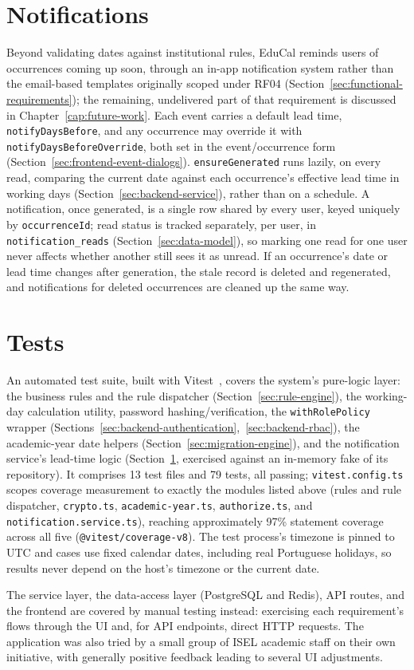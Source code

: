 \section{Notifications} \label{sec:backend-notifications}

Beyond validating dates against institutional rules, EduCal reminds users of occurrences coming up soon, through an in-app notification system rather than the email-based templates originally scoped under RF04 (Section~\ref{sec:functional-requirements}); the remaining, undelivered part of that requirement is discussed in Chapter~\ref{cap:future-work}. Each event carries a default lead time, \texttt{notifyDaysBefore}, and any occurrence may override it with \texttt{notifyDaysBeforeOverride}, both set in the event/occurrence form (Section~\ref{sec:frontend-event-dialogs}). \texttt{ensureGenerated} runs lazily, on every read, comparing the current date against each occurrence's effective lead time in working days (Section~\ref{sec:backend-service}), rather than on a schedule. A notification, once generated, is a single row shared by every user, keyed uniquely by \texttt{occurrenceId}; read status is tracked separately, per user, in \texttt{notification\_reads} (Section~\ref{sec:data-model}), so marking one read for one user never affects whether another still sees it as unread. If an occurrence's date or lead time changes after generation, the stale record is deleted and regenerated, and notifications for deleted occurrences are cleaned up the same way.

\section{Tests} \label{sec:backend-tests}

An automated test suite, built with Vitest~\cite{vitest}, covers the system's pure-logic layer: the business rules and the rule dispatcher (Section~\ref{sec:rule-engine}), the working-day calculation utility, password hashing/verification, the \texttt{withRolePolicy} wrapper (Sections~\ref{sec:backend-authentication},~\ref{sec:backend-rbac}), the academic-year date helpers (Section~\ref{sec:migration-engine}), and the notification service's lead-time logic (Section~\ref{sec:backend-notifications}, exercised against an in-memory fake of its repository). It comprises 13 test files and 79 tests, all passing; \texttt{vitest.config.ts} scopes coverage measurement to exactly the modules listed above (rules and rule dispatcher, \texttt{crypto.ts}, \texttt{academic-year.ts}, \texttt{authorize.ts}, and \texttt{notification.service.ts}), reaching approximately 97\% statement coverage across all five (\texttt{@vitest/coverage-v8}). The test process's timezone is pinned to UTC and cases use fixed calendar dates, including real Portuguese holidays, so results never depend on the host's timezone or the current date.

The service layer, the data-access layer (PostgreSQL and Redis), API routes, and the frontend are covered by manual testing instead: exercising each requirement's flows through the UI and, for API endpoints, direct HTTP requests. The application was also tried by a small group of ISEL academic staff on their own initiative, with generally positive feedback leading to several UI adjustments.
